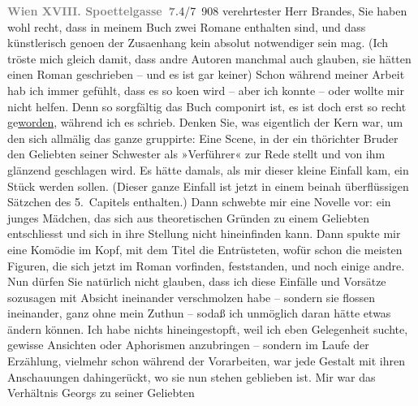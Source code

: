 \pstart
           \textcolor{gray}{\textbf{Wien XVIII. Spoettelgasse 7.}}\hfill 4/7 908\pend
           \vspace{0.5em}
\pstart
           verehrtester Herr Brandes, Sie haben wohl recht, dass in meinem Buch zwei Romane enthalten
               sind, und dass künstlerisch geno{\geminationm}en der Zusa{\geminationm}enhang kein absolut notwendiger sein mag. (Ich tröste
               mich gleich damit, dass andre Autoren manchmal auch glauben, sie hätten einen Roman
               geschrieben – und es ist gar keiner) Schon während meiner Arbeit hab ich immer
               gefühlt, dass es so ko{\geminationm}en wird – aber ich konnte – oder
               wollte mir nicht helfen. Denn so sorgfältig das Buch componirt ist, es ist doch erst
               so recht ge{\pb}\uline{worden}, während ich es schrieb. Denken Sie, was
               eigentlich der Kern war, um den sich allmälig das ganze gruppirte: Eine Scene, in der
               ein thörichter Bruder den Geliebten seiner Schwester als »Verführer« zur Rede stellt
               und von ihm glänzend geschlagen wird. Es hätte damals, als mir dieser kleine Einfall
               kam, ein Stück werden sollen. (Dieser ganze Einfall ist jetzt in einem beinah
               überflüssigen Sätzchen des 5. Capitels enthalten.) Dann schwebte mir eine Novelle
               vor: ein junges Mädchen, das sich aus theoretischen Gründen zu einem Geliebten
               entschliesst und sich in ihre Stellung nicht hineinfinden kann. Dann spukte mir eine
               Komödie im Kopf, mit dem Titel {\pb}die Entrüsteten, wofür schon die
               meisten Figuren, die sich jetzt im Roman vorfinden, feststanden, und noch einige
               andre. Nun dürfen Sie natürlich nicht glauben, dass ich diese Einfälle und Vorsätze
               sozusagen mit Absicht ineinander verschmolzen habe – sondern sie flossen ineinander,
               ganz ohne mein Zuthun – sodaß ich unmöglich daran hätte etwas ändern können. Ich habe
               nichts hineingestopft, weil ich eben Gelegenheit suchte, gewisse Ansichten oder
               Aphorismen anzubringen – sondern im Laufe der Erzählung, vielmehr schon während der
               Vorarbeiten, war jede Gestalt mit ihren Anschauungen dahingerückt, wo sie nun stehen
               geblieben ist. Mir war {\pb}das Verhältnis Georgs zu seiner Geliebten

